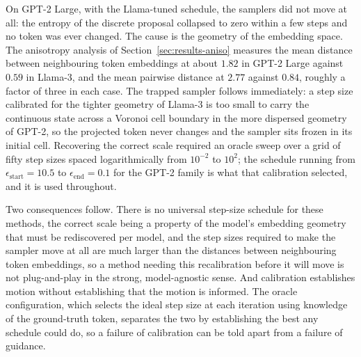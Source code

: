 On GPT-2 Large, with the Llama-tuned schedule, the samplers did not move at all: the entropy of the discrete proposal collapsed to zero within a few steps and no token was ever changed. The cause is the geometry of the embedding space. The anisotropy analysis of Section~\ref{sec:results-aniso} measures the mean distance between neighbouring token embeddings at about $1.82$ in GPT-2 Large against $0.59$ in Llama-3, and the mean pairwise distance at $2.77$ against $0.84$, roughly a factor of three in each case.
The trapped sampler follows immediately: a step size calibrated for the tighter geometry of Llama-3 is too small to carry the continuous state across a Voronoi cell boundary in the more dispersed geometry of GPT-2, so the projected token never changes and the sampler sits frozen in its initial cell. Recovering the correct scale required an oracle sweep over a grid of fifty step sizes spaced logarithmically from $10^{-2}$ to $10^{2}$; the schedule running from $\epsilon_{\text{start}} = 10.5$ to $\epsilon_{\text{end}} = 0.1$ for the GPT-2 family is what that calibration selected, and it is used throughout.

Two consequences follow. There is no universal step-size schedule for these methods, the correct scale being a property of the model's embedding geometry that must be rediscovered per model, and the step sizes required to make the sampler move at all are much larger than the distances between neighbouring token embeddings, so a method needing this recalibration before it will move is not plug-and-play in the strong, model-agnostic sense. And calibration establishes motion without establishing that the motion is informed. The oracle configuration, which selects the ideal step size at each iteration using knowledge of the ground-truth token, separates the two by establishing the best any schedule could do, so a failure of calibration can be told apart from a failure of guidance.

\label{sec:results-quench}

